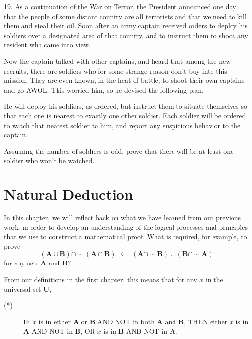 \documentclass{article}
\newcommand\A{\mathbf A}
\newcommand\B{\mathbf B}
\newcommand\U{\mathbf U}
\newcommand{\0}{\mathbf 0}
\newcommand{\1}{\mathbf 1}
\begin{document}
\begin{description}
  \item{19.} As a continuation of the War on Terror, the President announced one day that the people of some distant country are all terrorists and that we need to kill them and steal their oil. Soon after an army captain received orders to deploy his soldiers over a designated area of that country, and to instruct them to shoot any resident who came into view.

    Now the captain talked with other captains, and heard that among the new recruits, there are soldiers who for some strange reason don't buy into this mission. They are even known, in the heat of battle, to shoot their own captains and go AWOL. This worried him, so he devised the following plan.

    He will deploy his soldiers, as ordered, but instruct them to situate themselves so that each one is nearest to exactly one other soldier. Each soldier will be ordered to watch that nearest soldier to him, and report any suspicious behavior to the captain.

    Assuming the number of soldiers is odd, prove that there will be at least one soldier who won't be watched.
\end{description}




\newpage

\section{Natural Deduction}


In this chapter, we will reflect back on what we have learned from our previous work, in order to develop an understanding of the logical processes and principles that we use to construct a mathematical proof. What is required, for example, to prove
\begin{equation*}
(\A \cup \B) \cap \sim (\A \cap \B) \enspace \subseteq \enspace (\A \cap \sim \B) \cup (\B \cap \sim \A)
\end{equation*}
for any sets $\A$ and $\B$?

From our definitions in the first chapter, this means that for any $x$ in the universal set $\U$,
\begin{description}
  \item[(*)] IF $x$ is in either $\A$ or $\B$ AND NOT in both $\A$ and $\B$, THEN either $x$ is in $\A$ AND NOT in $\B$, OR $x$ is in $\B$ AND NOT in $\A$.
\end{description}
\end{document}
